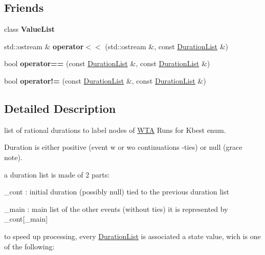 \subsection*{Friends}
\begin{DoxyCompactItemize}
\item 
\mbox{\label{classDurationList_acbbc9db77db3732eb9a76e196643b8a3}} 
class {\bfseries Value\+List}
\item 
\mbox{\label{classDurationList_a2f53bdd7088bae40a9af5e68417344d2}} 
std\+::ostream \& {\bfseries operator$<$$<$} (std\+::ostream \&, const \mbox{\hyperlink{classDurationList}{Duration\+List}} \&)
\item 
\mbox{\label{classDurationList_afd2381979aba148c0fed7fe76f2a0a18}} 
bool {\bfseries operator==} (const \mbox{\hyperlink{classDurationList}{Duration\+List}} \&, const \mbox{\hyperlink{classDurationList}{Duration\+List}} \&)
\item 
\mbox{\label{classDurationList_a66728c3d4d95e47d289cfae97e407a08}} 
bool {\bfseries operator!=} (const \mbox{\hyperlink{classDurationList}{Duration\+List}} \&, const \mbox{\hyperlink{classDurationList}{Duration\+List}} \&)
\end{DoxyCompactItemize}


\subsection{Detailed Description}
list of rational durations to label nodes of \mbox{\hyperlink{classWTA}{W\+TA}} Runs for Kbest enum. 

Duration is either positive (event w or wo continuations -\/ties) or null (grace note).

a duration list is made of 2 parts\+:
\begin{DoxyItemize}
\item \+\_\+cont \+: initial duration (possibly null) tied to the previous duration list
\item \+\_\+main \+: main list of the other events (without ties) it is represented by \+\_\+cont\mbox{[}\+\_\+main\mbox{]}
\end{DoxyItemize}

to speed up processing, every \mbox{\hyperlink{classDurationList}{Duration\+List}} is associated a state value, wich is one of the following\+:


